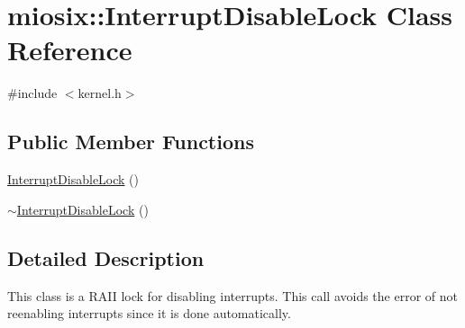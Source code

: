 \hypertarget{classmiosix_1_1_interrupt_disable_lock}{\section{miosix\-:\-:Interrupt\-Disable\-Lock Class Reference}
\label{classmiosix_1_1_interrupt_disable_lock}
}


{\ttfamily \#include $<$kernel.\-h$>$}

\subsection*{Public Member Functions}
\begin{DoxyCompactItemize}
\item 
\hyperlink{classmiosix_1_1_interrupt_disable_lock_aeee39d909e99f88789419bb2bbad59c7}{Interrupt\-Disable\-Lock} ()
\item 
\hyperlink{classmiosix_1_1_interrupt_disable_lock_a8989ce6efe8d4930cf045e01b157b288}{$\sim$\-Interrupt\-Disable\-Lock} ()
\end{DoxyCompactItemize}


\subsection{Detailed Description}
This class is a R\-A\-I\-I lock for disabling interrupts. This call avoids the error of not reenabling interrupts since it is done automatically. 

